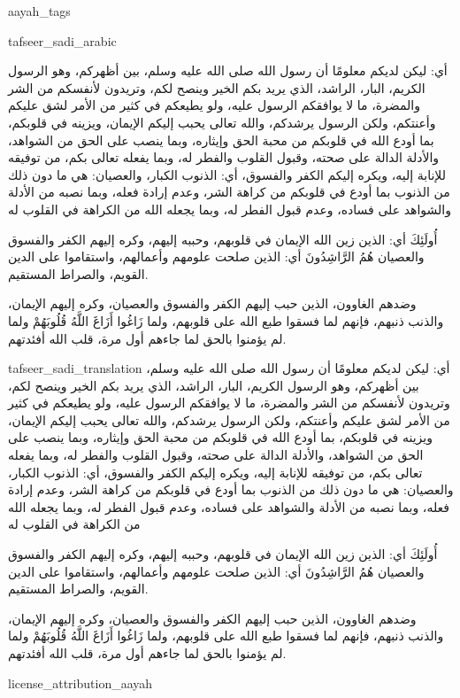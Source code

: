 \begin{taggedblock}{aayah_tags}
\end{taggedblock}
\begin{taggedblock}{tafseer_sadi_arabic}
\begin{Arabic}
أي: ليكن لديكم معلومًا أن رسول الله صلى الله عليه وسلم، بين أظهركم، وهو الرسول الكريم، البار، الراشد، الذي يريد بكم الخير وينصح لكم، وتريدون لأنفسكم من الشر والمضرة، ما لا يوافقكم الرسول عليه، ولو يطيعكم في كثير من الأمر لشق عليكم وأعنتكم، ولكن الرسول يرشدكم، والله تعالى يحبب إليكم الإيمان، ويزينه في قلوبكم، بما أودع الله في قلوبكم من محبة الحق وإيثاره، وبما ينصب على الحق من الشواهد، والأدلة الدالة على صحته، وقبول القلوب والفطر له، وبما يفعله تعالى بكم، من توفيقه للإنابة إليه، ويكره إليكم الكفر والفسوق، أي: الذنوب الكبار، والعصيان: هي ما دون ذلك من الذنوب  بما أودع في قلوبكم من كراهة الشر، وعدم إرادة فعله، وبما نصبه من الأدلة والشواهد على فساده، وعدم قبول الفطر له، وبما يجعله الله من الكراهة في القلوب له

{ أُولَئِكَ }
أي: الذين زين الله الإيمان في قلوبهم، وحببه إليهم، وكره إليهم الكفر والفسوق والعصيان
{ هُمُ الرَّاشِدُونَ }
أي: الذين صلحت علومهم وأعمالهم، واستقاموا على الدين القويم، والصراط المستقيم.

وضدهم الغاوون، الذين حبب إليهم الكفر والفسوق والعصيان، وكره إليهم الإيمان، والذنب ذنبهم، فإنهم لما فسقوا طبع الله على قلوبهم، ولما
{ زَاغُوا أَزَاغَ اللَّهُ قُلُوبَهُمْ }
ولما لم يؤمنوا بالحق لما جاءهم أول مرة، قلب الله أفئدتهم.
\end{Arabic}
\end{taggedblock}
\begin{taggedblock}{tafseer_sadi_translation}
أي: ليكن لديكم معلومًا أن رسول الله صلى الله عليه وسلم، بين أظهركم، وهو الرسول الكريم، البار، الراشد، الذي يريد بكم الخير وينصح لكم، وتريدون لأنفسكم من الشر والمضرة، ما لا يوافقكم الرسول عليه، ولو يطيعكم في كثير من الأمر لشق عليكم وأعنتكم، ولكن الرسول يرشدكم، والله تعالى يحبب إليكم الإيمان، ويزينه في قلوبكم، بما أودع الله في قلوبكم من محبة الحق وإيثاره، وبما ينصب على الحق من الشواهد، والأدلة الدالة على صحته، وقبول القلوب والفطر له، وبما يفعله تعالى بكم، من توفيقه للإنابة إليه، ويكره إليكم الكفر والفسوق، أي: الذنوب الكبار، والعصيان: هي ما دون ذلك من الذنوب  بما أودع في قلوبكم من كراهة الشر، وعدم إرادة فعله، وبما نصبه من الأدلة والشواهد على فساده، وعدم قبول الفطر له، وبما يجعله الله من الكراهة في القلوب له

{ أُولَئِكَ }
أي: الذين زين الله الإيمان في قلوبهم، وحببه إليهم، وكره إليهم الكفر والفسوق والعصيان
{ هُمُ الرَّاشِدُونَ }
أي: الذين صلحت علومهم وأعمالهم، واستقاموا على الدين القويم، والصراط المستقيم.

وضدهم الغاوون، الذين حبب إليهم الكفر والفسوق والعصيان، وكره إليهم الإيمان، والذنب ذنبهم، فإنهم لما فسقوا طبع الله على قلوبهم، ولما
{ زَاغُوا أَزَاغَ اللَّهُ قُلُوبَهُمْ }
ولما لم يؤمنوا بالحق لما جاءهم أول مرة، قلب الله أفئدتهم.
\end{taggedblock}
\begin{taggedblock}{license_attribution_aayah}

\end{taggedblock}
\begin{comment}
Please use the following for footnotes:- Sample\footnoteQ{Text of Qur'an footnote goes here.}.
Sample\footnoteT{Text of Tafseer footnote goes here.}.
\end{comment}